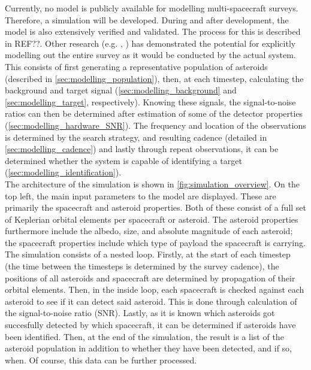 Currently, no model is publicly available for modelling multi-spacecraft surveys. Therefore, a simulation will be developed. During and after development, the model is also extensively verified and validated. The process for this is described in REF??. Other research (e.g. \cite{Flyeye}, \cite{2017NEOSDT}) has demonstrated the potential for explicitly modelling out the entire survey as it would be conducted by the actual system. This consists of first generating a representative population of asteroids (described in \autoref{sec:modelling_population}), then, at each timestep, calculating the background and target signal (\autoref{sec:modelling_background} and \autoref{sec:modelling_target}, respectively). Knowing these signals, the signal-to-noise ratios can then be determined after estimation of some of the detector properties (\autoref{sec:modelling_hardware_SNR}). The frequency and location of the observations is determined by the search strategy, and resulting cadence (detailed in \autoref{sec:modelling_cadence}) and lastly through repeat observations, it can be determined whether the system is capable of identifying a target (\autoref{sec:modelling_identification}).\\


The architecture of the simulation is shown in \autoref{fig:simulation_overview}. On the top left, the main input parameters to the model are displayed. These are primarily the spacecraft and asteroid properties. Both of these consist of a full set of Keplerian orbital elements per spacecraft or asteroid. The asteroid properties furthermore include the albedo, size, and absolute magnitude of each asteroid; the spacecraft properties include which type of payload the spacecraft is carrying. \\

The simulation consists of a nested loop. Firstly, at the start of each timestep (the time between the timesteps is determined by the survey cadence), the positions of all asteroids and spacecraft are determined by propagation of their orbital elements. Then, in the inside loop, each spacecraft is checked against each asteroid to see if it can detect said asteroid. This is done through calculation of the signal-to-noise ratio (SNR). Lastly, as it is known which asteroids got succesfully detected by which spacecraft, it can be determined if asteroids have been identified. Then, at the end of the simulation, the result is a list of the asteroid population in addition to whether they have been detected, and if so, when. Of course, this data can be further processed.

